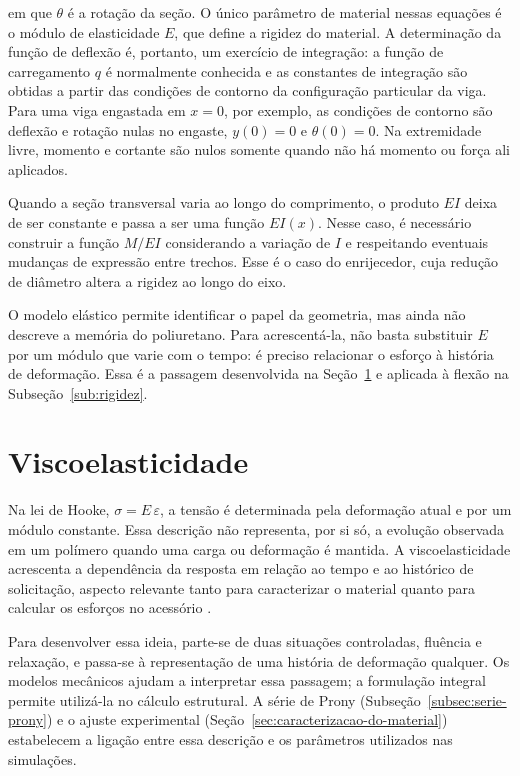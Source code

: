 \documentclass[arial,centeredequations,english,brazilian,oneside,section=TITLE]{ifes8}
\begin{document}
em que $\theta$ é a rotação da seção. O único parâmetro de material nessas equações é o
módulo de elasticidade $E$, que define a rigidez do material.
A determinação da função de deflexão é, portanto, um exercício de integração: a função
de carregamento $q$ é normalmente conhecida e as constantes de integração são obtidas
a partir das condições de contorno da configuração particular da viga.
Para uma viga engastada em $x = 0$, por exemplo, as
condições de contorno são deflexão e rotação nulas no engaste, $y(0) = 0$ e
$\theta(0) = 0$. Na extremidade livre, momento e cortante são nulos somente
quando não há momento ou força ali aplicados.

Quando a seção transversal varia ao longo do comprimento, o produto $E I$ deixa de
ser constante e passa a ser uma função $E I(x)$. Nesse caso, é necessário construir
a função $M/EI$ considerando a variação de $I$ e respeitando eventuais mudanças
de expressão entre trechos. Esse é o caso do enrijecedor, cuja redução de diâmetro
altera a rigidez ao longo do eixo.

O modelo elástico permite identificar o papel da geometria, mas ainda não descreve
a memória do poliuretano. Para acrescentá-la, não basta substituir $E$ por um
módulo que varie com o tempo: é preciso relacionar o esforço à história de
deformação. Essa é a passagem desenvolvida na Seção~\ref{sec:viscoelasticidade}
e aplicada à flexão na Subseção~\ref{sub:rigidez}.


\section{Viscoelasticidade}
\label{sec:viscoelasticidade}

Na lei de Hooke, $\sigma=E\,\varepsilon$, a tensão é determinada pela deformação
atual e por um módulo constante. Essa descrição não representa, por si só, a
evolução observada em um polímero quando uma carga ou deformação é mantida.
A viscoelasticidade acrescenta a dependência da resposta em relação ao tempo
e ao histórico de solicitação, aspecto relevante tanto para caracterizar o
material quanto para calcular os esforços no acessório
\cite{Pagliosa2004,Caire2011}.

Para desenvolver essa ideia, parte-se de duas situações controladas, fluência
e relaxação, e passa-se à representação de uma história de deformação qualquer.
Os modelos mecânicos ajudam a interpretar essa passagem; a formulação integral
permite utilizá-la no cálculo estrutural. A série de Prony
(Subseção~\ref{subsec:serie-prony}) e o ajuste experimental
(Seção~\ref{sec:caracterizacao-do-material}) estabelecem a ligação entre
essa descrição e os parâmetros utilizados nas simulações.
\end{document}
